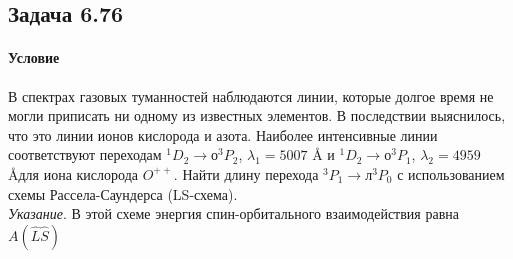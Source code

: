 \documentclass[12pt]{article}
\begin{document}
\subsection{Задача 6.76}
\label{task_6.76}
\paragraph{Условие}
В спектрах газовых туманностей наблюдаются линии, которые долгое время не могли приписать ни одному из известных элементов. В последствии выяснилось, что это линии ионов кислорода и азота. Наиболее интенсивные линии соответствуют переходам $^1D_2 \rightarrow о^3P_2$, $\lambda_1 = 5007$ \AA\text{ } и $^1D_2 \rightarrow о^3P_1$, $\lambda_2 = 4959$ \AA\text{ }для иона кислорода $O^{++}$. Найти длину перехода $^3P_1 \rightarrow л^3P_0$ с использованием схемы Рассела-Саундерса (LS-схема).\\
\textit{Указание}. В этой схеме энергия спин-орбитального взаимодействия равна $A( \hat{L}\hat{S} )$
\end{document}
